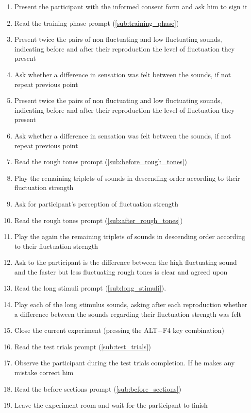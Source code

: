 \documentclass[../main.tex]{subfiles}
\begin{document}
\begin{enumerate}
  \item Present the participant with the informed consent form and ask him to
  sign it
  \item Read the training phase prompt (\ref{sub:training_phase})
  \item Present twice the pairs of non fluctuating and low fluctuating sounds,
  indicating before and after their reproduction the level of fluctuation they
  present
  \item Ask whether a difference in sensation was felt between the sounds, if
  not repeat previous point
  \item Present twice the pairs of non fluctuating and low fluctuating sounds,
  indicating before and after their reproduction the level of fluctuation they
  present
  \item Ask whether a difference in sensation was felt between the sounds, if
  not repeat previous point
  \item Read the rough tones prompt (\ref{sub:before_rough_tones})
  \item Play the remaining triplets of sounds in descending order according to
  their fluctuation strength
  \item Ask for participant's perception of fluctuation strength
  \item Read the rough tones prompt (\ref{sub:after_rough_tones})
  \item Play the again the remaining triplets of sounds in descending order
  according to their fluctuation strength
  \item Ask to the participant is the difference between the high fluctuating
  sound and the faster but less fluctuating rough tones is clear and agreed
  upon
  \item Read the long stimuli prompt (\ref{sub:long_stimuli}).
  \item Play each of the long stimulus sounds, asking after each reproduction
  whether a difference between the sounds regarding their fluctuation strength
  was felt
  \item Close the current experiment (pressing the ALT+F4 key combination)
  \item Read the test trials prompt (\ref{sub:test_trials})
  \item Observe the participant during the test trials completion. If he makes
  any mistake correct him
  \item Read the before sections prompt (\ref{sub:before_sections})
  \item Leave the experiment room and wait for the participant to finish
\end{enumerate}
\end{document}
